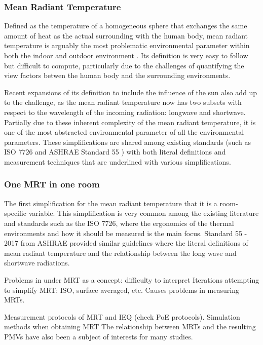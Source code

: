 \subsubsection{Mean Radiant Temperature}
    Defined as the temperature of a homogeneous sphere that exchanges the same amount of heat as the actual surrounding with the human body, mean radiant temperature is arguably the most problematic environmental parameter within both the indoor and outdoor environment \cite{kantor_most_2011}. Its definition is very easy to follow but difficult to compute, particularly due to the challenges of quantifying the view factors betwen the human body and the surrounding environments.

    Recent expansions of its definition to include the influence of the sun also add up to the challenge, as the mean radiant temperature now has two subsets with respect to the wavelength of the incoming radiation: longwave and shortwave\cite{ansi/ashrae_standard_2017}. Partially due to these inherent complexity of the mean radiant temperature, it is one of the most abstracted environmental parameter of all the environmental parameters. These simplifications are shared among existing standards (such as ISO 7726 \cite{standardization_iso7726_2001} and ASHRAE Standard 55 \cite{ansi/ashrae_standard_2017}) with both literal definitions and measurement techniques that are underlined with various simplifications. 
\subsubsection{One MRT in one room}
    The first simplification for the mean radiant temperature that it is a room-specific variable. This simplification is very common among the existing literature and standards such as the ISO 7726\cite{standardization_iso7726_2001}, where the ergonomics of the thermal environments and how it should be measured is the main focus. Standard 55 - 2017 from ASHRAE provided similar guidelines where the literal definitions of mean radiant temperature and the relationship between the long wave and shortwave radiations. 

            Problems in under MRT as a concept: difficulty to interpret Iterations attempting to simplify MRT: ISO, surface averaged, etc. Causes problems in measuring MRTs.

            Measurement protocols of MRT and IEQ (check PoE protocols).
            Simulation methods when obtaining MRT
            The relationship between MRTs and the resulting PMVs have also been a subject of interests for many studies. 
